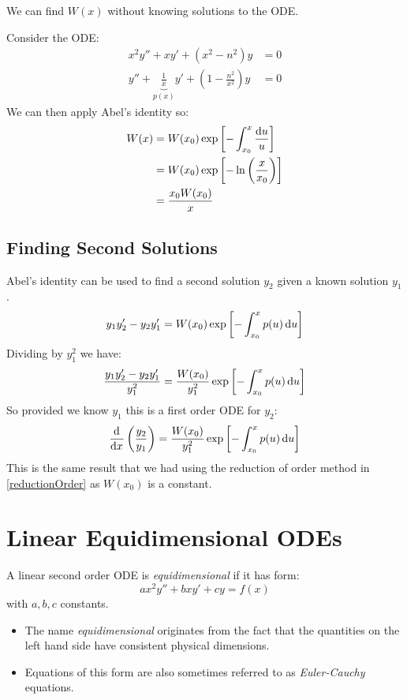 \documentclass[../main.tex]{subfiles}
\begin{document}
We can find $W(x)$ without knowing solutions to the ODE.
\begin{example}
  Consider the ODE:
  \begin{align*}
    x^2 y'' + xy' + (x^2 - n^2)y &= 0 \\
    y'' + \underbrace{\frac{1}{x}}_{p(x)}y' + \left(1 - \frac{n^2}{x^2}\right)y &= 0
  \end{align*}
  We can then apply Abel's identity so:
  \begin{align*}
    W(x) &= W(x_0)\exp\left[-\int_{x_0}^{x} \frac{\d{u}}{u}\right] \\
         &= W(x_0)\exp\left[-\ln\left(\frac{x}{x_0}\right)\right] \\
         &= \frac{x_0 W(x_0)}{x}
  \end{align*}
\end{example}
\subsection{Finding Second Solutions}
Abel's identity can be used to find a second solution $y_2$ given a known solution $y_1$.
\[
  y_1 y_2' - y_2 y_1' = W(x_0)\exp\left[-\int_{x_0}^{x} p(u) \d{u}\right]
\]
Dividing by $y^{2}_{1}$ we have:
\[
  \frac{y_1 y_2' - y_2 y_1'}{y^2_1} = \frac{W(x_0)}{y^{2}_{1}}\exp\left[-\int_{x_0}^{x} p(u) \d{u}\right]
\]
So provided we know $y_1$ this is a first order ODE for $y_2$:
\[
  \deriv{}{x}\left(\frac{y_2}{y_1}\right) = \frac{W(x_0)}{y^{2}_{1}}\exp\left[-\int_{x_0}^{x} p(u) \d{u}\right]
\]
This is the same result that we had using the reduction of order method in \cref{reductionOrder} as $W(x_0)$ is a constant.

\section{Linear Equidimensional ODEs}
\begin{definition}
  A linear second order ODE is \textit{equidimensional} if it has form:
  \begin{equation}
    \label{generalEquidimensional}
    ax^2 y'' + bx y' + cy = f(x)
  \end{equation}
  with $a, b, c$ constants.
\end{definition}
\begin{remark}[Nomenclature]
  \begin{itemize}
    \item The name \textit{equidimensional} originates from the fact that the quantities on the left hand side have consistent physical dimensions.
    \item Equations of this form are also sometimes referred to as \textit{Euler-Cauchy} equations.
  \end{itemize}
\end{remark}
\end{document}
